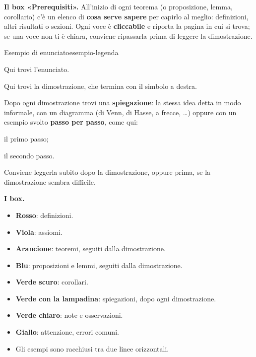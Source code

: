 \textbf{Il box «Prerequisiti».} All'inizio di ogni teorema (o proposizione, lemma, corollario) c'è un elenco di
\textbf{cosa serve sapere} per capirlo al meglio: definizioni, altri risultati o sezioni. Ogni voce è
\textbf{cliccabile} e riporta la pagina in cui si trova; se una voce non ti è chiara, conviene ripassarla prima di
leggere la dimostrazione.

\begin{concetto}
\begin{Proposizione}{Esempio di enunciato}{esempio-legenda}
    \begin{prerequisiti}
    \end{prerequisiti}
    Qui trovi l'enunciato.
\end{Proposizione}
\begin{dimostrazione}
    Qui trovi la dimostrazione, che termina con il simbolo a destra.
\end{dimostrazione}
\end{concetto}

\begin{spiegazione}
    Dopo ogni dimostrazione trovi una \textbf{spiegazione}: la stessa idea detta in modo informale, con un diagramma (di Venn, di Hasse,
    a frecce, \dots) oppure con un esempio svolto \textbf{passo per passo}, come qui:
    \begin{passi}
        \item il primo passo;
        \item il secondo passo.
    \end{passi}
    Conviene leggerla subito dopo la dimostrazione, oppure prima, se la dimostrazione sembra difficile.
\end{spiegazione}

\textbf{I box.}
\begin{itemize}
    \item \textcolor{red!75!black}{\textbf{Rosso}}: definizioni.
    \item \textcolor{accent!80!black}{\textbf{Viola}}: assiomi.
    \item \textcolor{orange!85!black}{\textbf{Arancione}}: teoremi, seguiti dalla dimostrazione.
    \item \textcolor{primary!80!black}{\textbf{Blu}}: proposizioni e lemmi, seguiti dalla dimostrazione.
    \item \textcolor{seagreen!65!black}{\textbf{Verde scuro}}: corollari.
    \item \textcolor{seagreen!65!black}{\textbf{Verde con la lampadina}}: spiegazioni, dopo ogni dimostrazione.
    \item \textcolor{green-gradient-6!70!black}{\textbf{Verde chiaro}}: note e osservazioni.
    \item \textcolor{yellow-gradient-6!70!black}{\textbf{Giallo}}: attenzione, errori comuni.
    \item Gli esempi sono racchiusi tra due linee orizzontali.
\end{itemize}

